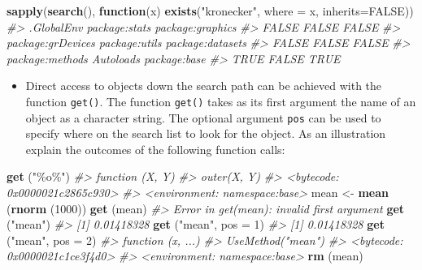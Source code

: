 \documentclass[
]{book}
\newenvironment{Shaded}{\begin{snugshade}}{\end{snugshade}}
\newcommand{\AttributeTok}[1]{\textcolor[rgb]{0.13,0.29,0.53}{#1}}
\newcommand{\CommentTok}[1]{\textcolor[rgb]{0.56,0.35,0.01}{\textit{#1}}}
\newcommand{\ConstantTok}[1]{\textcolor[rgb]{0.56,0.35,0.01}{#1}}
\newcommand{\ControlFlowTok}[1]{\textcolor[rgb]{0.13,0.29,0.53}{\textbf{#1}}}
\newcommand{\DecValTok}[1]{\textcolor[rgb]{0.00,0.00,0.81}{#1}}
\newcommand{\FunctionTok}[1]{\textcolor[rgb]{0.13,0.29,0.53}{\textbf{#1}}}
\newcommand{\NormalTok}[1]{#1}
\newcommand{\OtherTok}[1]{\textcolor[rgb]{0.56,0.35,0.01}{#1}}
\newcommand{\StringTok}[1]{\textcolor[rgb]{0.31,0.60,0.02}{#1}}
\providecommand{\tightlist}{%
  \setlength{\itemsep}{0pt}\setlength{\parskip}{0pt}}
\begin{document}
\begin{Shaded}
\begin{Highlighting}[]
\FunctionTok{sapply}\NormalTok{(}\FunctionTok{search}\NormalTok{(), }\ControlFlowTok{function}\NormalTok{(x) }\FunctionTok{exists}\NormalTok{(}\StringTok{"kronecker"}\NormalTok{, }\AttributeTok{where =}\NormalTok{ x, }\AttributeTok{inherits=}\ConstantTok{FALSE}\NormalTok{))}
\CommentTok{\#\textgreater{}        .GlobalEnv     package:stats  package:graphics }
\CommentTok{\#\textgreater{}             FALSE             FALSE             FALSE }
\CommentTok{\#\textgreater{} package:grDevices     package:utils  package:datasets }
\CommentTok{\#\textgreater{}             FALSE             FALSE             FALSE }
\CommentTok{\#\textgreater{}   package:methods         Autoloads      package:base }
\CommentTok{\#\textgreater{}              TRUE             FALSE              TRUE}
\end{Highlighting}
\end{Shaded}

\begin{itemize}
\tightlist
\item
  Direct access to objects down the search path can be achieved with the function \texttt{get()}.
  The function \texttt{get()} takes as its first argument the name of an object as a character string. The optional argument \texttt{pos} can be used to specify where on the search list to look for the object. As an illustration explain the outcomes of the following function calls:
\end{itemize}

\begin{Shaded}
\begin{Highlighting}[]
\FunctionTok{get}\NormalTok{ (}\StringTok{"\%o\%"}\NormalTok{) }
\CommentTok{\#\textgreater{} function (X, Y) }
\CommentTok{\#\textgreater{} outer(X, Y)}
\CommentTok{\#\textgreater{} \textless{}bytecode: 0x0000021c2865c930\textgreater{}}
\CommentTok{\#\textgreater{} \textless{}environment: namespace:base\textgreater{}}
\NormalTok{mean }\OtherTok{\textless{}{-}} \FunctionTok{mean}\NormalTok{ (}\FunctionTok{rnorm}\NormalTok{ (}\DecValTok{1000}\NormalTok{))}
\FunctionTok{get}\NormalTok{ (mean)}
\CommentTok{\#\textgreater{} Error in get(mean): invalid first argument}
\FunctionTok{get}\NormalTok{ (}\StringTok{"mean"}\NormalTok{) }
\CommentTok{\#\textgreater{} [1] 0.01418328}
\FunctionTok{get}\NormalTok{ (}\StringTok{"mean"}\NormalTok{, }\AttributeTok{pos =} \DecValTok{1}\NormalTok{) }
\CommentTok{\#\textgreater{} [1] 0.01418328}
\FunctionTok{get}\NormalTok{ (}\StringTok{"mean"}\NormalTok{, }\AttributeTok{pos =} \DecValTok{2}\NormalTok{)}
\CommentTok{\#\textgreater{} function (x, ...) }
\CommentTok{\#\textgreater{} UseMethod("mean")}
\CommentTok{\#\textgreater{} \textless{}bytecode: 0x0000021c1ce3f4d0\textgreater{}}
\CommentTok{\#\textgreater{} \textless{}environment: namespace:base\textgreater{}}
\FunctionTok{rm}\NormalTok{ (mean)}
\end{Highlighting}
\end{Shaded}
\end{document}
